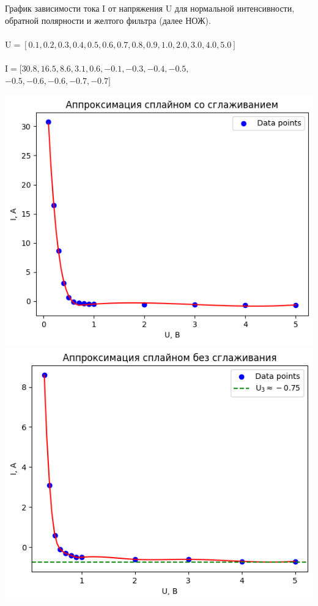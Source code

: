 \documentclass[12pt,openany]{book}
\begin{document}
\noindent График зависимости тока I от напряжения U для нормальной интенсивности, 
обратной полярности и желтого фильтра (далее НОЖ).\\\\
$\text{U} = [0.1, 0.2, 0.3, 0.4, 0.5, 0.6, 0.7, 0.8, 0.9, 1.0, 2.0, 3.0, 4.0, 5.0]$\\\\
$\text{I} = [30.8, 16.5, 8.6, 3.1, 0.6, -0.1, -0.3, -0.4, -0.5,$\\
$ -0.5, -0.6, -0.6, -0.7, -0.7]$\\
\begin{center}
    \includegraphics[scale=0.59]{3} \\

    \includegraphics[scale=0.59]{4} \\
\end{center}
\end{document}
